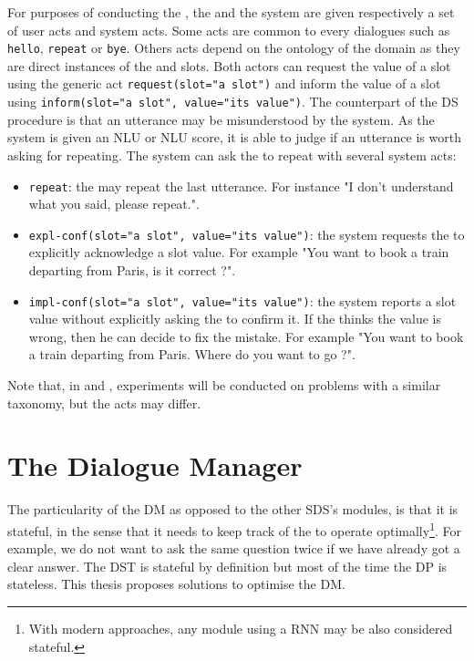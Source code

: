 For purposes of conducting the , the  and the system are given respectively a set of user acts and system acts. Some acts are common to every dialogues such as \texttt{hello}, \texttt{repeat} or \texttt{bye}. Others acts depend on the ontology of the domain as they are direct instances of the \requestable and \informable slots. Both actors can request the value of a slot using the generic act \texttt{request(slot="a slot")} and inform the value of a slot using \texttt{inform(slot="a slot", value="its value")}. The counterpart of the \gls{DS}  procedure is that an utterance may be misunderstood by the system. As the system is given an \gls{NLU} or \gls{NLU} score, it is able to judge if an utterance is worth asking for repeating. The system can ask the  to repeat with several system acts:

\begin{itemize}
    \item \texttt{repeat}: the  may repeat the last utterance. For instance "I don't understand what you said, please repeat.".
    \item \texttt{expl-conf(slot="a slot", value="its value")}: the system requests the  to explicitly acknowledge a slot value. For example "You want to book a train departing from Paris, is it correct ?".
    \item \texttt{impl-conf(slot="a slot", value="its value")}: the system reports a slot value without explicitly asking the  to confirm it. If the  thinks the value is wrong, then he can decide to fix the mistake. For example "You want to book a train departing from Paris. Where do you want to go ?".
\end{itemize}

Note that, in  and , experiments will be conducted on  problems with a similar taxonomy, but the acts may differ.


\section{The Dialogue Manager}
\label{sec:dm}

The particularity of the \gls{DM} as opposed to the other \gls{SDS}'s modules, is that it is stateful, in the sense that it needs to keep track of the  to operate optimally\footnote{With modern approaches, any module using a \gls{RNN} may be also considered stateful.}. For example, we do not want to ask the same question twice if we have already got a clear answer. The \gls{DST} is stateful by definition but most of the time the \gls{DP} is stateless. This thesis proposes solutions to optimise the \gls{DM}.

